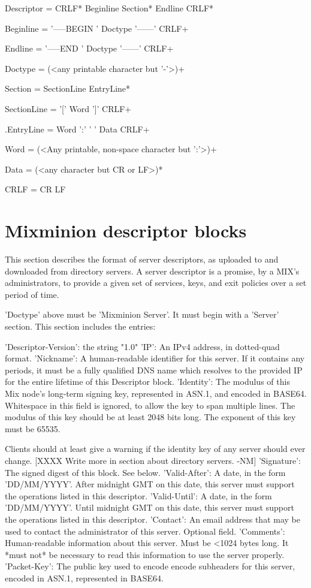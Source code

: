Descriptor = CRLF* Beginline Section* Endline CRLF*

Beginline = '-----BEGIN ' Doctype '------' CRLF+

Endline = '-----END ' Doctype '------' CRLF+

Doctype = (<any printable character but '-'>)+

Section = SectionLine EntryLine*

SectionLine = '[' Word ']' CRLF+

.EntryLine = Word ':' ' ' Data CRLF+

Word = (<Any printable, non-space character but ':'>)+

Data = (<any character but CR or LF>)*

CRLF = CR LF

\section{Mixminion descriptor blocks}

This section describes the format of server descriptors, as uploaded
to and downloaded from directory servers.  A server descriptor is a
promise, by a MIX's administrators, to provide a given set of
services, keys, and exit policies over a set period of time.

'Doctype' above must be 'Mixminion Server'.  It must begin with a
'Server' section.  This section includes the entries:

     'Descriptor-Version':  the string "1.0"
     'IP': An IPv4 address, in dotted-quad format.
     'Nickname': A human-readable identifier for this server.  If it
         contains any periods, it must be a fully qualified DNS name
         which resolves to the provided IP for the entire lifetime of
         this Descriptor block.
     'Identity': The modulus of this Mix node's long-term signing key,
         represented in ASN.1, and encoded in BASE64.  Whitespace in
         this field is ignored, to allow the key to span multiple
         lines.  The modulus of this key should be at least 2048 bits
         long.  The exponent of this key must be 65535.

	 Clients should at least give a warning if the identity key of
         any server should ever change. [XXXX Write more in section
         about directory servers. -NM]
     'Signature': The signed digest of this block.  See below.
     'Valid-After': A date, in the form 'DD/MM/YYYY'.  After midnight GMT
         on this date, this server must support the operations listed
         in this descriptor.
     'Valid-Until': A date, in the form 'DD/MM/YYYY'.  Until midnight
         GMT on this date, this server must support the operations listed
         in this descriptor.
     'Contact': An email address that may be used to contact the
         administrator of this server. Optional field.
     'Comments': Human-readable information about this server.  Must
         be <1024 bytes long.  It *must not* be necessary to read this
         information to use the server properly.
     'Packet-Key': The public key used to encode encode subheaders for
         this server, encoded in ASN.1, represented in BASE64. 

